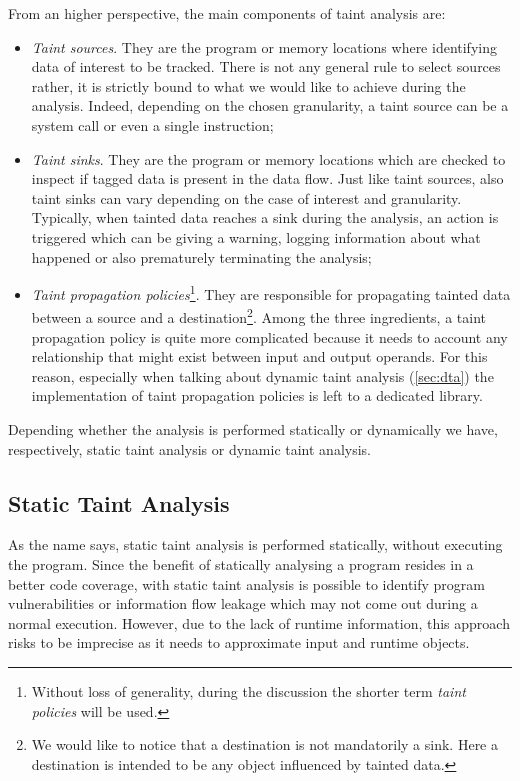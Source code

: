 \documentclass[LaM,binding=0.6cm]{sapthesis}
\begin{document}
From an higher perspective, the main components of taint analysis are: 
\begin{itemize}
\item \textit{Taint sources}. They are the program or memory locations where identifying data of interest to be tracked. There is not any general rule to select sources rather, it is strictly bound to what we would like to achieve during the analysis. Indeed, depending on the chosen granularity, a taint source can be a system call or even a single instruction;
\item \textit{Taint sinks}. They are the program or memory locations which are checked to inspect if tagged data is present in the data flow. Just like taint sources, also taint sinks can vary depending on the case of interest and granularity. Typically, when tainted data reaches a sink during the analysis, an action is triggered which can be giving a warning, logging information about what happened or also prematurely terminating the analysis;
\item \textit{Taint propagation policies}\footnote{Without loss of generality, during the discussion the shorter term \textit{taint policies} will be used.}. They are responsible for propagating tainted data between a source and a destination\footnote{We would like to notice that a destination is not mandatorily a sink. Here a destination is intended to be any object influenced by tainted data.}. Among the three ingredients, a taint propagation policy is quite more complicated because it needs to account any relationship that might exist between input and output operands. For this reason, especially when talking about dynamic taint analysis (\autoref{sec:dta}) the implementation of taint propagation policies is left to a dedicated library.
\end{itemize}
Depending whether the analysis is performed statically or dynamically we have, respectively, static taint analysis or dynamic taint analysis.

\subsection{Static Taint Analysis}
As the name says, static taint analysis is performed statically, without executing the program. Since the benefit of statically analysing a program resides in a better code coverage, with static taint analysis is possible to identify program vulnerabilities or information flow leakage which may not come out during a normal execution. However, due to the lack of runtime information, this approach risks to be imprecise as it needs to approximate input and runtime objects\cite{arzt2014flowdroid}.
\end{document}
